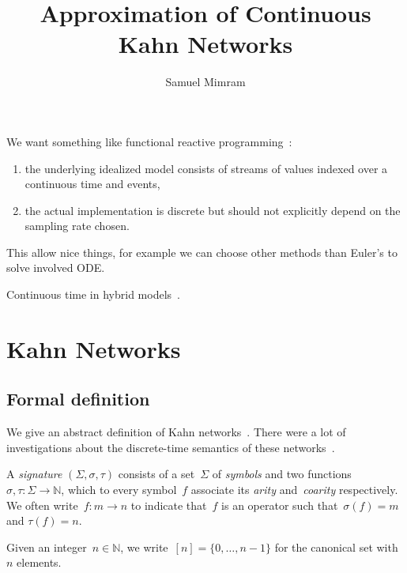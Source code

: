\documentclass{article}
\title{Approximation of Continuous Kahn Networks}
\author{Samuel Mimram}
\newcommand{\N}{\mathbb{N}}
\newcommand{\intset}[1]{[#1]}
\begin{document}
\maketitle

We want something like functional reactive
programming~\cite{elliott1997functional}:
\begin{enumerate}
\item the underlying idealized model consists of streams of values indexed over
  a continuous time and events,
\item the actual implementation is discrete but should not explicitly depend on
  the sampling rate chosen.
\end{enumerate}
This allow nice things, for example we can choose other methods than Euler's to
solve involved ODE.

Continuous time in hybrid models~\cite{liu:causality-hybrid}.


\section{Kahn Networks}
\subsection{Formal definition}
We give an abstract definition of Kahn
networks~\cite{kahn:semantics-parallel}. There were a lot of investigations
about the discrete-time semantics of these
networks~\cite{hildebrandt2004relational, ...}.

A \emph{signature} $(\Sigma,\sigma,\tau)$ consists of a set~$\Sigma$ of
\emph{symbols} and two functions \hbox{$\sigma,\tau:\Sigma\to\N$}, which to
every symbol~$f$ associate its \emph{arity} and~\emph{coarity} respectively. We
often write~$f:m\to n$ to indicate that~$f$ is an operator such that~$\sigma(f)=m$
and \hbox{$\tau(f)=n$}.

Given an integer~$n\in\N$, we write~$\intset{n}=\{0,\ldots,n-1\}$ for the
canonical set with~$n$ elements.
\end{document}
